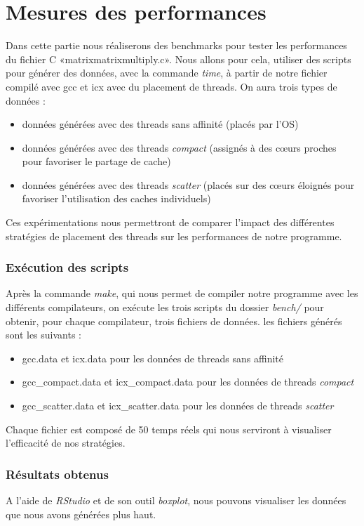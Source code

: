 \documentclass{rapport}
\begin{document}
  \part{Mesures des performances}
    Dans cette partie nous réaliserons des benchmarks pour tester les performances du fichier C «matrixmatrixmultiply.c».
    Nous allons pour cela, utiliser des scripts pour générer des données, avec la commande \textit{time}, à partir de notre fichier compilé avec gcc et icx avec du placement de threads. On aura trois types de données : 
    \begin{itemize}
        \item données générées avec des threads sans affinité (placés par l'OS)
        \item données générées avec des threads \textit{compact} (assignés à des cœurs proches pour favoriser le partage de cache)
        \item données générées avec des threads \textit{scatter} (placés sur des cœurs éloignés pour favoriser l'utilisation des caches individuels)
    \end{itemize}
    Ces expérimentations nous permettront de comparer l'impact des différentes stratégies de placement des threads sur les performances de notre programme.
    \section{Exécution des scripts}
    Après la commande \textit{make}, qui nous permet de compiler notre programme avec les différents compilateurs,
        on exécute les trois scripts du dossier \textit{bench/} pour obtenir, pour chaque compilateur, trois fichiers de données.
        les fichiers générés sont les suivants : 
        \begin{itemize}
            \item gcc.data et icx.data pour les données de threads sans affinité
            \item gcc\_compact.data et icx\_compact.data pour les données de threads \textit{compact}
            \item gcc\_scatter.data et icx\_scatter.data pour les données de threads \textit{scatter}
        \end{itemize}
        Chaque fichier est composé de 50 temps réels qui nous serviront à visualiser l'efficacité  de nos stratégies.
    
    \section{Résultats obtenus}
        A l'aide de \textit{RStudio} et de son outil \textit{boxplot}, nous pouvons visualiser les données que nous avons générées plus haut.
\end{document}
